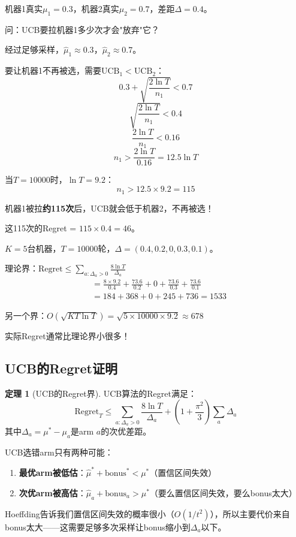 \documentclass[11pt,a4paper]{article}
\theoremstyle{definition}
\newtheorem{theorem}{定理}[section]
\begin{document}
\begin{calculation}[UCB什么时候放弃差机器]
机器1真实$\mu_1 = 0.3$，机器2真实$\mu_2 = 0.7$，差距$\Delta = 0.4$。

问：UCB要拉机器1多少次才会"放弃"它？

经过足够采样，$\hat{\mu}_1 \approx 0.3$，$\hat{\mu}_2 \approx 0.7$。

要让机器1不再被选，需要$\text{UCB}_1 < \text{UCB}_2$：
\[
0.3 + \sqrt{\frac{2\ln T}{n_1}} < 0.7
\]
\[
\sqrt{\frac{2\ln T}{n_1}} < 0.4
\]
\[
\frac{2\ln T}{n_1} < 0.16
\]
\[
n_1 > \frac{2\ln T}{0.16} = 12.5\ln T
\]

当$T = 10000$时，$\ln T = 9.2$：
\[
n_1 > 12.5 \times 9.2 = 115
\]

机器1被拉\textbf{约115次}后，UCB就会低于机器2，不再被选！

这115次的Regret = $115 \times 0.4 = 46$。
\end{calculation}

\begin{calculation}[UCB的Regret界]
$K=5$台机器，$T=10000$轮，$\Delta = (0.4, 0.2, 0, 0.3, 0.1)$。

理论界：$\text{Regret} \leq \sum_{a:\Delta_a > 0} \frac{8\ln T}{\Delta_a}$
\begin{align*}
&= \frac{8 \times 9.2}{0.4} + \frac{73.6}{0.2} + 0 + \frac{73.6}{0.3} + \frac{73.6}{0.1} \\
&= 184 + 368 + 0 + 245 + 736 = 1533
\end{align*}

另一个界：$O(\sqrt{KT\ln T}) = \sqrt{5 \times 10000 \times 9.2} \approx 678$

实际Regret通常比理论界小很多！
\end{calculation}

\subsection{UCB的Regret证明}

\begin{theorem}[UCB的Regret界]
UCB算法的Regret满足：
\[
\text{Regret}_T \leq \sum_{a: \Delta_a > 0} \frac{8\ln T}{\Delta_a} + \left(1 + \frac{\pi^2}{3}\right)\sum_a \Delta_a
\]
其中$\Delta_a = \mu^* - \mu_a$是arm $a$的次优差距。
\end{theorem}

\begin{plainwords}[证明的核心思想]
UCB选错arm只有两种可能：
\begin{enumerate}
    \item \textbf{最优arm被低估}：$\hat{\mu}^* + \text{bonus}^* < \mu^*$（置信区间失效）
    \item \textbf{次优arm被高估}：$\hat{\mu}_a + \text{bonus}_a > \mu^*$（要么置信区间失效，要么bonus太大）
\end{enumerate}

Hoeffding告诉我们置信区间失效的概率很小（$O(1/t^2)$），所以主要代价来自bonus太大——这需要足够多次采样让bonus缩小到$\Delta_a$以下。
\end{plainwords}
\end{document}
